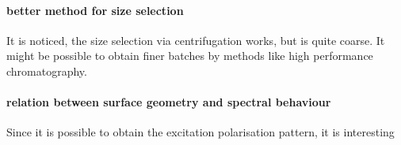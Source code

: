 \paragraph{better method for size selection}
It is noticed, the size selection via centrifugation works, but is quite coarse. It might be possible to obtain finer batches by methods like high performance chromatography.

\paragraph{relation between surface geometry and spectral behaviour}
Since it is possible to obtain the excitation polarisation pattern, it is interesting
